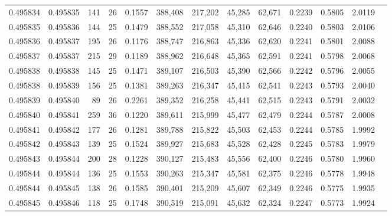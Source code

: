 \begin{tabular}{rrrrrrrrrrrrr}
0.495834 & 0.495835 & 141 &  26 &                                     0.1557 & 388,408 & 217,202 &  45,285 &  62,671 & 0.2239 & 0.5805 & 2.0119 \\
0.495835 & 0.495836 & 144 &  25 &                                     0.1479 & 388,552 & 217,058 &  45,310 &  62,646 & 0.2240 & 0.5803 & 2.0106 \\
0.495836 & 0.495837 & 195 &  26 &                                     0.1176 & 388,747 & 216,863 &  45,336 &  62,620 & 0.2241 & 0.5801 & 2.0088 \\
0.495837 & 0.495837 & 215 &  29 &                                     0.1189 & 388,962 & 216,648 &  45,365 &  62,591 & 0.2241 & 0.5798 & 2.0068 \\
0.495838 & 0.495838 & 145 &  25 &                                     0.1471 & 389,107 & 216,503 &  45,390 &  62,566 & 0.2242 & 0.5796 & 2.0055 \\
0.495838 & 0.495839 & 156 &  25 &                                     0.1381 & 389,263 & 216,347 &  45,415 &  62,541 & 0.2243 & 0.5793 & 2.0040 \\
0.495839 & 0.495840 &  89 &  26 &                                     0.2261 & 389,352 & 216,258 &  45,441 &  62,515 & 0.2243 & 0.5791 & 2.0032 \\
0.495840 & 0.495841 & 259 &  36 &                                     0.1220 & 389,611 & 215,999 &  45,477 &  62,479 & 0.2244 & 0.5787 & 2.0008 \\
0.495841 & 0.495842 & 177 &  26 &                                     0.1281 & 389,788 & 215,822 &  45,503 &  62,453 & 0.2244 & 0.5785 & 1.9992 \\
0.495842 & 0.495843 & 139 &  25 &                                     0.1524 & 389,927 & 215,683 &  45,528 &  62,428 & 0.2245 & 0.5783 & 1.9979 \\
0.495843 & 0.495844 & 200 &  28 &                                     0.1228 & 390,127 & 215,483 &  45,556 &  62,400 & 0.2246 & 0.5780 & 1.9960 \\
0.495844 & 0.495844 & 136 &  25 &                                     0.1553 & 390,263 & 215,347 &  45,581 &  62,375 & 0.2246 & 0.5778 & 1.9948 \\
0.495844 & 0.495845 & 138 &  26 &                                     0.1585 & 390,401 & 215,209 &  45,607 &  62,349 & 0.2246 & 0.5775 & 1.9935 \\
0.495845 & 0.495846 & 118 &  25 &                                     0.1748 & 390,519 & 215,091 &  45,632 &  62,324 & 0.2247 & 0.5773 & 1.9924 \\

\end{tabular}

